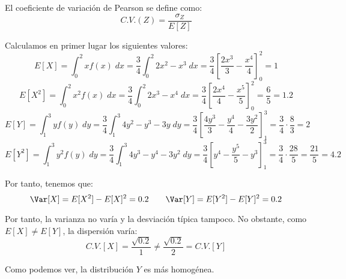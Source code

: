 \begin{ejercicio}
\begin{enumerate}
        El coeficiente de variación de Pearson se define como:
        \begin{equation*}
            C.V.(Z) = \frac{\sigma_Z}{E[Z]}
        \end{equation*}

        Calculamos en primer lugar los siguientes valores:
        \begin{equation*}
            E[X] = \int_0^2 xf(x)\;dx = \frac{3}{4}\int_0^2 2x^2-x^3\;dx = \frac{3}{4}\left[\frac{2x^3}{3}-\frac{x^4}{4}\right]_0^2 = 1
        \end{equation*}
        \begin{equation*}
            E[X^2] = \int_0^2 x^2f(x)\;dx = \frac{3}{4}\int_0^2 2x^3-x^4\;dx = \frac{3}{4}\left[\frac{2x^4}{4}-\frac{x^5}{5}\right]_0^2 = \frac{6}{5} = 1.2
        \end{equation*}
        \begin{equation*}
            E[Y] = \int_1^3 yf(y)\;dy = \frac{3}{4}\int_1^3 4y^2-y^3-3y\;dy = \frac{3}{4}\left[\frac{4y^3}{3} - \frac{y^4}{4} - \frac{3y^2}{2}\right]_1^3 = \frac{3}{4}\cdot \frac{8}{3} = 2
        \end{equation*}
        \begin{equation*}
            E[Y^2] = \int_1^3 y^2f(y)\;dy = \frac{3}{4}\int_1^3 4y^3-y^4-3y^2\;dy = \frac{3}{4}\left[y^4 - \frac{y^5}{5} - y^3\right]_1^3 = \frac{3}{4}\cdot \frac{28}{5} = \frac{21}{5} = 4.2
        \end{equation*}

        Por tanto, tenemos que:
        \begin{equation*}
            \Var[X] = E[X^2] -E[X]^2 = 0.2
            \qquad
            \Var[Y] = E[Y^2] -E[Y]^2 = 0.2
        \end{equation*}

        Por tanto, la varianza no varía y la desviación típica tampoco. No obstante, como $E[X]\neq E[Y]$, la dispersión varía:
        \begin{equation*}
            C.V.[X] = \frac{\sqrt{0.2}}{1} \neq \frac{\sqrt{0.2}}{2} = C.V.[Y]
        \end{equation*}

        Como podemos ver, la distribución $Y$ es más homogénea.
    \end{enumerate}
\end{ejercicio}



